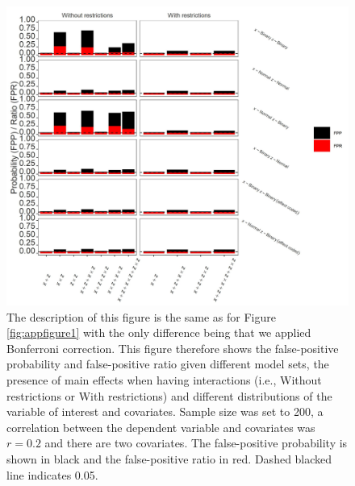 

\begin{figure}[ht!]
\includegraphics[width=1\textwidth]{R/Analysis/Result/Figures/Figure1ASIBon.jpeg}
\centering
\caption{The description of this figure is the same as for Figure \ref{fig:appfigure1} with the only difference being that we applied Bonferroni correction. This figure therefore shows the false-positive probability and false-positive ratio given different model sets, the presence of main effects when having interactions (i.e., Without restrictions or With restrictions) and different distributions of the variable of interest and covariates. Sample size was set to 200, a correlation between the dependent variable and covariates was $\textit{r}=0.2$ and there are two covariates. The false-positive probability is shown in black and the false-positive ratio in red. Dashed blacked line indicates 0.05. }
\label{fig:appfigure7}
\end{figure}

